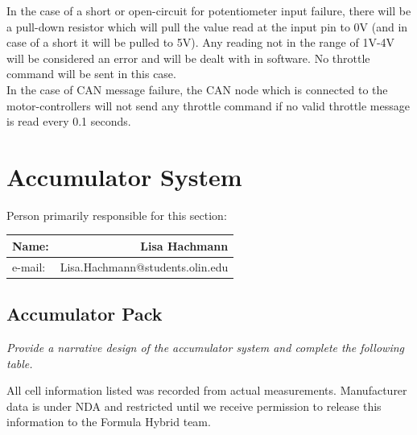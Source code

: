 \documentclass{article}
\begin{document}
    \textnormal{
    In the case of a short or open-circuit for potentiometer input failure, there will be a pull-down resistor which will pull the value read at the input pin to 0V (and in case of a short it will be pulled to 5V). Any reading not in the range of 1V-4V will be considered an error and will be dealt with in software. No throttle command will be sent in this case.
    }\\

    \textnormal{
    In the case of CAN message failure, the CAN node which is connected to the motor-controllers will not send any throttle command if no valid throttle message is read every 0.1 seconds.
    }

\section{Accumulator System}

        Person primarily responsible for this section:

            \begin{table}[H]
                \centering
                \label{responsible5}
                \begin{tabular}{lr}
                Name: & Lisa Hachmann \\ \hline
                e-mail: & Lisa.Hachmann@students.olin.edu \\ \hline
                \end{tabular}
            \end{table}

    \subsection{Accumulator Pack}

        \textit{Provide a narrative design of the accumulator system and complete the following table.}

        All cell information listed was recorded from actual measurements. Manufacturer data is under NDA and restricted until we receive permission to release this information to the Formula Hybrid team.
\end{document}
